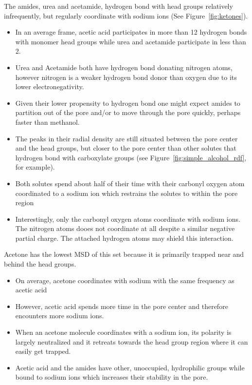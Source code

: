 \documentclass{article}
\begin{document}
  \noindent The amides, urea and acetamide, hydrogen bond with head groups relatively 
  infrequently, but regularly coordinate with sodium ions (See Figure~\ref{fig:ketones}).
  \begin{itemize}
    \item In an average frame, acetic acid participates in more than 12 hydrogen 
    bonds with monomer head groups while urea and acetamide participate in less than 2.
    \item Urea and Acetamide both have hydrogen bond donating nitrogen atoms, however
  	nitrogen is a weaker hydrogen bond donor than oxygen due to its lower electronegativity.
  	\item Given their lower propensity to hydrogen bond one might expect amides to partition
  	out of the pore and/or to move through the pore quickly, perhaps faster than methanol.
    \item The peaks in their radial density are still situated between the pore center and the
    head groups, but closer to the pore center than other solutes that hydrogen bond with 
    carboxylate groups (see Figure~\ref{fig:simple_alcohol_rdf}, for example).
    \item Both solutes spend about half of their time with their carbonyl oxygen atom 
    coordinated to a sodium ion which restrains the solutes to within the pore region
    \item Interestingly, only the carbonyl oxygen atoms coordinate with sodium ions. 
    The nitrogen atoms dooes not coordinate at all despite a similar negative partial
    charge. The attached hydrogen atoms may shield this interaction.
  \end{itemize}   

  \noindent Acetone has the lowest MSD of this set because it is primarily trapped near and behind 
  the head groups.
  \begin{itemize}
    \item On average, acetone coordinates with sodium with the same frequency as acetic acid 
    \item However, acetic acid spends more time in the pore center and therefore encounters
    more sodium ions.
    \item When an acetone molecule coordinates with a sodium ion, its polarity is 
    largely neutralized and it retreats towards the head group region where it can easily
    get trapped.
    \item Acetic acid and the amides have other, unoccupied, hydrophilic groups while bound
    to sodium ions which increases their stability in the pore.
  \end{itemize}
  
\end{document}
